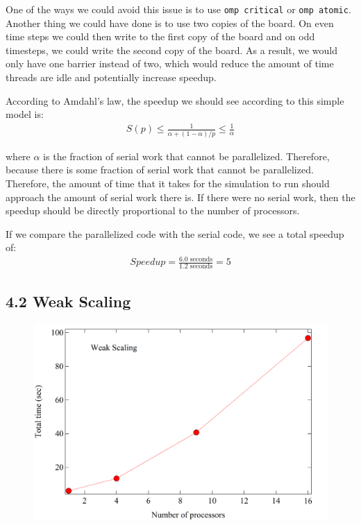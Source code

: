 \documentclass[11pt]{article}
\begin{document}
        One of the ways we could avoid this issue is to use \texttt{omp critical} or \texttt{omp atomic}. Another thing we could have done is to use two copies of the board. On even time steps we could then write to the first copy of the board and on odd timesteps, we could write the second copy of the board. As a result, we would only have one barrier instead of two, which would reduce the amount of time threads are idle and potentially increase speedup.

        According to Amdahl's law, the speedup we should see according to this simple model is:
        \begin{align*}
            S(p) \leq \frac{1}{\alpha + (1-\alpha)/p} \leq \frac{1}{\alpha}
        \end{align*}

        where $\alpha$ is the fraction of serial work that cannot be parallelized. Therefore, because there is some fraction of serial work that cannot be parallelized. Therefore, the amount of time that it takes for the simulation to run should approach the amount of serial work there is. If there were no serial work, then the speedup should be directly proportional to the number of processors.

        If we compare the parallelized code with the serial code, we see a total speedup of:
        \begin{align*}
            Speedup = \frac{6.0 \text{ seconds}}{1.2 \text{ seconds}} = 5
        \end{align*}

    \subsection{4.2 Weak Scaling}
        \begin{figure}[H]
            \centering
            \includegraphics[width=5in]{weak.png}
        \end{figure}
\end{document}
